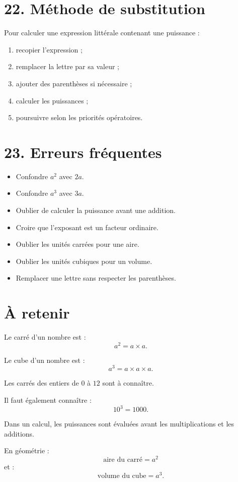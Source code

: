 \section{22. Méthode de substitution}

\begin{methode}
Pour calculer une expression littérale contenant une puissance :
\begin{enumerate}
\item recopier l'expression ;
\item remplacer la lettre par sa valeur ;
\item ajouter des parenthèses si nécessaire ;
\item calculer les puissances ;
\item poursuivre selon les priorités opératoires.
\end{enumerate}
\end{methode}

\section{23. Erreurs fréquentes}

\begin{itemize}
\item Confondre $a^2$ avec $2a$.
\item Confondre $a^3$ avec $3a$.
\item Oublier de calculer la puissance avant une addition.
\item Croire que l'exposant est un facteur ordinaire.
\item Oublier les unités carrées pour une aire.
\item Oublier les unités cubiques pour un volume.
\item Remplacer une lettre sans respecter les parenthèses.
\end{itemize}

\section{À retenir}

\begin{aretenir}
Le carré d'un nombre est :
\[
\boxed{a^2=a\times a}.
\]

Le cube d'un nombre est :
\[
\boxed{a^3=a\times a\times a}.
\]

Les carrés des entiers de $0$ à $12$ sont à connaître.

Il faut également connaître :
\[
\boxed{10^3=1000}.
\]

Dans un calcul, les puissances sont évaluées avant les multiplications et les additions.

En géométrie :
\[
\boxed{\text{aire du carré}=a^2}
\]
et :
\[
\boxed{\text{volume du cube}=a^3}.
\]
\end{aretenir}
